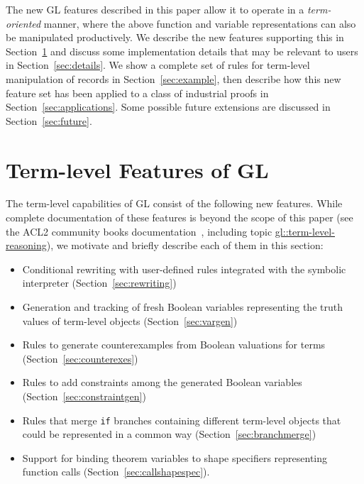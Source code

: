 \documentclass[submission,copyright,creativecommons]{eptcs}
\begin{document}
The new GL features described in this paper allow it to operate in a
{\em term-oriented} manner, where the above function and variable
representations can also be manipulated productively.  We describe the
new features supporting this in Section~\ref{sec:features} and discuss
some implementation details that may be relevant to users in
Section~\ref{sec:details}.  We show a complete set of rules for
term-level manipulation of records in Section~\ref{sec:example}, then
describe how this new feature set has been applied to a class of
industrial proofs in Section~\ref{sec:applications}. Some possible
future extensions are discussed in Section~\ref{sec:future}.

\section{Term-level Features of GL}
\label{sec:features}
The term-level capabilities of GL consist of the following new
features. 
While complete documentation of these features is beyond
the scope of this paper (see the ACL2 community books
documentation~\cite{acl2:doc}, including topic
\href{http://www.cs.utexas.edu/users/moore/acl2/manuals/current/manual/?topic=GL____TERM-LEVEL-REASONING}{\underline{gl::term-level-reasoning}}), we motivate and briefly describe each of them in this section:

\begin{itemize}
\item Conditional rewriting with user-defined rules integrated with the symbolic interpreter (Section~\ref{sec:rewriting})
\item Generation and tracking of fresh Boolean variables representing the truth values of term-level objects (Section~\ref{sec:vargen})
\item Rules to generate counterexamples from Boolean valuations for terms (Section~\ref{sec:counterexes})
\item Rules to add constraints among the generated Boolean variables (Section~\ref{sec:constraintgen})
\item Rules that merge \texttt{if} branches containing different term-level objects that could be represented in a common way (Section~\ref{sec:branchmerge})
\item Support for binding theorem variables to shape specifiers representing function calls (Section~\ref{sec:callshapespec}).
\end{itemize}
\end{document}
